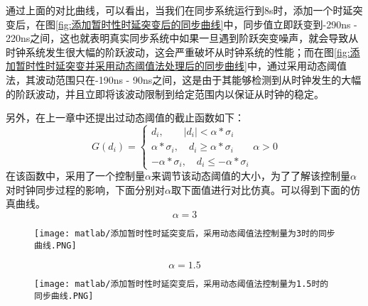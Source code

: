 通过上面的对比曲线，可以看出，当我们在同步系统运行到8s时，添加一个时延突变后，在图\ref{fig:添加暂时性时延突变后的同步曲线}中，同步值立即跃变到-290ns - 220ns之间，这也就表明真实同步系统中如果一旦遇到阶跃突变噪声，就会导致从时钟系统发生很大幅的阶跃波动，这会严重破坏从时钟系统的性能；而在图\ref{fig:添加暂时性时延突变并采用动态阈值法处理后的同步曲线}中，通过采用动态阈值法，其波动范围只在-190ns - 90ns之间，这是由于其能够检测到从时钟发生的大幅的阶跃波动，并且立即将该波动限制到给定范围内以保证从时钟的稳定。

另外，在上一章中还提出过动态阈值的截止函数如下：
\begin{equation}
G(d_{i}) = \left\{
  \begin{array}{lll} %
    d_{i}, \qquad \left | d_{i} \right | < \alpha * \sigma_{i} \\
    \alpha * \sigma_{i}, \quad d_{i} \geq \alpha * \sigma_{i} \\
    -\alpha * \sigma_{i}, \quad d_{i} \leq -\alpha * \sigma_{i}
  \end{array}
  \alpha > 0 \right. 
\end{equation}
在该函数中，采用了一个控制量$\alpha$来调节该动态阈值的大小，为了了解该控制量$\alpha$对时钟同步过程的影响，下面分别对$\alpha$取下面值进行对比仿真。可以得到下面的仿真曲线。
\begin{equation}
  \alpha = 3
\end{equation}
\begin{figure}[htbp]
  \centering
  \begin{minipage}[b]{1\textwidth}
    \captionstyle{\centering}
    \centering
    \texttt{[image: matlab/添加暂时性时延突变后，采用动态阈值法控制量为3时的同步曲线.PNG]}
  \end{minipage}     
\end{figure}
\begin{equation}
  \alpha = 1.5
\end{equation}
\begin{figure}[htbp]
  \centering
  \begin{minipage}[b]{1\textwidth}
    \captionstyle{\centering}
    \centering
    \texttt{[image: matlab/添加暂时性时延突变后，采用动态阈值法控制量为1.5时的同步曲线.PNG]}
  \end{minipage}     
\end{figure}
\\

